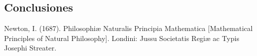 \documentclass{article}
\begin{document}
\begin{multicols}{2}
\section*{Conclusiones}\label{Conclusiones}				%


\begin{thebibliography}{9}						%

%
	Newton, I. (1687). Philosophiæ Naturalis Principia Mathematica [Mathematical Principles of Natural Philosophy]. Londini: Jussu Societatis Regiæ ac Typis Josephi Streater.
\end{thebibliography}


\end{multicols}
\end{document}

